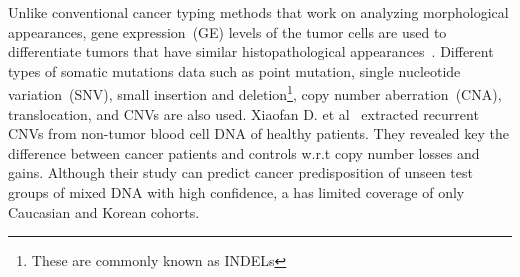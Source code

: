 \hspace*{3.5mm} Unlike conventional cancer typing methods that work on analyzing morphological appearances, gene expression~(GE) levels of the tumor cells are used to differentiate tumors that have similar histopathological appearances~\cite{paroder2006na+}. Different types of somatic mutations data such as point mutation, single nucleotide variation~(SNV), small insertion and deletion\footnote{These are commonly known as INDELs}, copy number aberration~(CNA), translocation, and CNVs are also used. Xiaofan D. et al~\cite{ding2014application} extracted recurrent CNVs from non-tumor blood cell DNA of healthy patients. They revealed key the difference between cancer patients and controls w.r.t copy number losses and gains. Although their study can predict cancer predisposition of unseen test groups of mixed DNA with high confidence, a has limited coverage of only Caucasian and Korean cohorts. 



